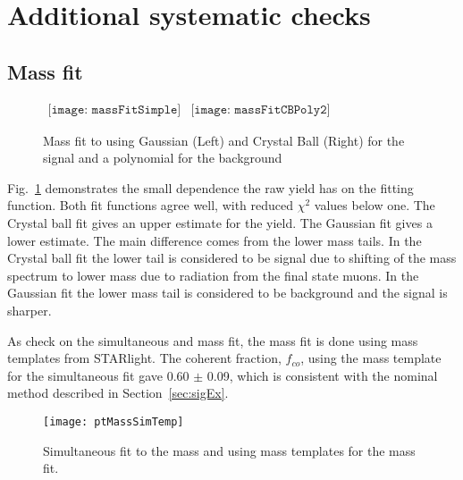   \section{\label{sec:extraSys}Additional systematic checks}
    \subsection{Mass fit}
      \begin{figure}[!Hhtb]
        \centering
        $ \begin{array}{cc}
          \texttt{[image: massFitSimple]} &
          \texttt{[image: massFitCBPoly2]}
        \end{array} $
        \caption{Mass fit to \JPsi{} using Gaussian (Left) and Crystal Ball (Right) for the 
          signal and a polynomial for the background}
        \label{fig:massFitSys}
      \end{figure}
      Fig.~\ref{fig:massFitSys} demonstrates the small dependence the raw 
        \JPsi{} yield has on the fitting function. 
      Both fit functions agree well, with reduced $\chi^{2}$ values below one.
      The Crystal ball fit gives an upper estimate for the \JPsi{} yield.
      The Gaussian fit gives a lower estimate. 
      The main difference comes from the lower mass tails.
      In the Crystal ball fit the lower tail is considered to be signal due to 
        shifting of the mass spectrum to lower mass due to radiation from the 
        final state muons. 
      In the Gaussian fit the lower mass tail is considered to be background and 
        the signal is sharper.
  
      As check on the simultaneous \pt{} and mass fit, the mass fit is done
        using mass templates from STARlight.
      The coherent fraction, $f_{co}$, using the mass template for the 
        simultaneous fit gave 0.60 $\pm$ 0.09, which is consistent with the 
        nominal method described in Section~\ref{sec:sigEx}.
      \begin{figure}[!Hhbt]
        \centering
        \texttt{[image: ptMassSimTemp]}
        \caption{Simultaneous fit to the mass and \pt{} using mass templates
          for the mass fit. }
        \label{fig:simFitTemp}
      \end{figure}
  
